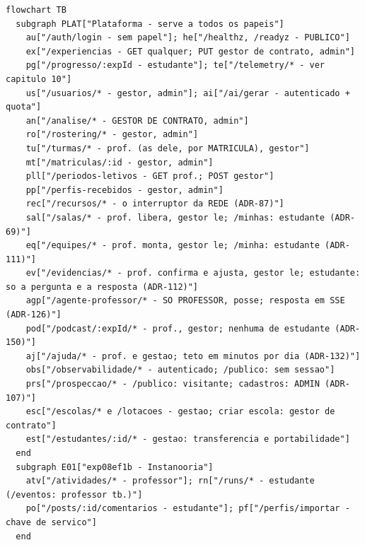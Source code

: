 \begin{lstlisting}[language=mermaid]
%% Figura 13.1 - plataforma e exp08ef1b
flowchart TB
  subgraph PLAT["Plataforma - serve a todos os papeis"]
    au["/auth/login - sem papel"]; he["/healthz, /readyz - PUBLICO"]
    ex["/experiencias - GET qualquer; PUT gestor de contrato, admin"]
    pg["/progresso/:expId - estudante"]; te["/telemetry/* - ver capitulo 10"]
    us["/usuarios/* - gestor, admin"]; ai["/ai/gerar - autenticado + quota"]
    an["/analise/* - GESTOR DE CONTRATO, admin"]
    ro["/rostering/* - gestor, admin"]
    tu["/turmas/* - prof. (as dele, por MATRICULA), gestor"]
    mt["/matriculas/:id - gestor, admin"]
    pll["/periodos-letivos - GET prof.; POST gestor"]
    pp["/perfis-recebidos - gestor, admin"]
    rec["/recursos/* - o interruptor da REDE (ADR-87)"]
    sal["/salas/* - prof. libera, gestor le; /minhas: estudante (ADR-69)"]
    eq["/equipes/* - prof. monta, gestor le; /minha: estudante (ADR-111)"]
    ev["/evidencias/* - prof. confirma e ajusta, gestor le; estudante: so a pergunta e a resposta (ADR-112)"]
    agp["/agente-professor/* - SO PROFESSOR, posse; resposta em SSE (ADR-126)"]
    pod["/podcast/:expId/* - prof., gestor; nenhuma de estudante (ADR-150)"]
    aj["/ajuda/* - prof. e gestao; teto em minutos por dia (ADR-132)"]
    obs["/observabilidade/* - autenticado; /publico: sem sessao"]
    prs["/prospeccao/* - /publico: visitante; cadastros: ADMIN (ADR-107)"]
    esc["/escolas/* e /lotacoes - gestao; criar escola: gestor de contrato"]
    est["/estudantes/:id/* - gestao: transferencia e portabilidade"]
  end
  subgraph E01["exp08ef1b - Instanooria"]
    atv["/atividades/* - professor"]; rn["/runs/* - estudante (/eventos: professor tb.)"]
    po["/posts/:id/comentarios - estudante"]; pf["/perfis/importar - chave de servico"]
  end
\end{lstlisting}

